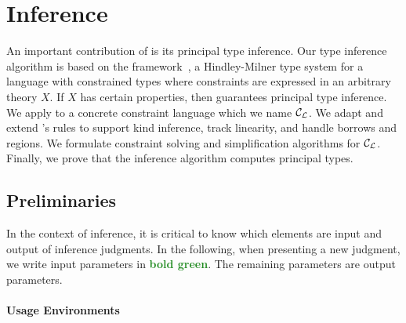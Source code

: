 \section{Inference}
\label{inference}

An important contribution of \affe is its principal type inference.
Our type inference algorithm is
based on the \hmx framework~\citep{DBLP:journals/tapos/OderskySW99},
a Hindley-Milner type system for a language
with constrained types where constraints are expressed in an arbitrary
theory $X$.
If $X$ has certain properties, then
\hmx guarantees principal type inference.
We apply \hmx to a concrete constraint language which we name ${\mathcal C_{\mathcal L}}$.
We adapt and extend \hmx's rules to support kind inference,
track linearity, and handle borrows and regions. We
formulate constraint solving and simplification algorithms for
${\mathcal C_{\mathcal L}}$. Finally, we prove that the inference algorithm computes
principal types. 

\subsection{Preliminaries}

In the context of inference, it is critical to know which elements
are input and output of inference judgments.
In the following, when presenting a new judgment,
we write input parameters in \textbf{\textcolor{ForestGreen}{bold
    green}}. The remaining parameters are output parameters.

\paragraph{Usage Environments}


